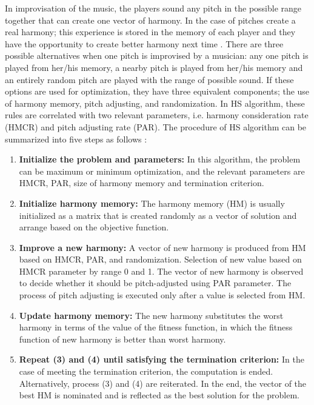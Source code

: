 \documentclass[10pt,letterpaper]{article}
\begin{document}
In improvisation of the music, the players sound any pitch in the possible range together that can create one vector of harmony. In the case of pitches create a real harmony; this experience is stored in the memory of each player and they have the opportunity to create better harmony next time \cite{Lee}. There are three possible alternatives when one pitch is improvised by a musician: any one pitch is played from her/his memory, a nearby pitch is played from her/his memory and an entirely random pitch are played with the range of possible sound. If these options are used for optimization, they have three equivalent components; the use of harmony memory, pitch adjusting, and randomization. In HS algorithm, these rules are correlated with two relevant parameters, i.e. harmony consideration rate (HMCR) and pitch adjusting rate (PAR). The procedure of HS algorithm can be summarized into five steps as follows \cite{Lee}:

\begin{enumerate}
    \item \textbf{Initialize the problem and parameters:} In this algorithm, the problem can be maximum or minimum optimization, and the relevant parameters are HMCR, PAR, size of harmony memory and termination criterion.
    \item \textbf{Initialize harmony memory:} The harmony memory (HM) is usually initialized as a matrix that is created randomly as a vector of solution and arrange based on the objective function.
    \item \textbf{Improve a new harmony:} A vector of new harmony is produced from HM based on HMCR, PAR, and randomization. Selection of new value based on HMCR parameter by range 0 and 1. The vector of new harmony is observed to decide whether it should be pitch-adjusted using PAR parameter. The process of pitch adjusting is executed only after a value is selected from HM. 
    \item \textbf{Update harmony memory:} The new harmony substitutes the worst harmony in terms of the value of the fitness function, in which the fitness function of new harmony is better than worst harmony. 
    \item \textbf{Repeat (3) and (4) until satisfying the termination criterion:} In the case of meeting the termination criterion, the computation is ended. Alternatively, process (3) and (4) are reiterated. In the end, the vector of the best HM is nominated and is reflected as the best solution for the problem. 
\end{enumerate}
\end{document}
